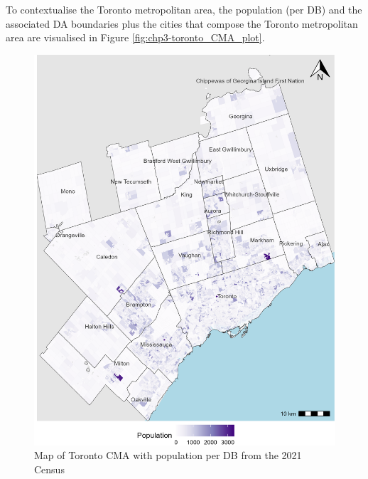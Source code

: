 \documentclass[
11pt, %
oneside, %
english, %
singlespacing, %
]{macthesis} %
\begin{document}
To contextualise the Toronto metropolitan area, the population (per DB) and the associated DA boundaries plus the cities that compose the Toronto metropolitan area are visualised in Figure \ref{fig:chp3-toronto_CMA_plot}.

\begin{figure}

{\centering \includegraphics[width=6in]{./data/figures/chp3-toronto_CMA_plot} 

}

\caption{\label{fig:chp3-toronto_CMA_plot}Map of Toronto CMA with population per DB from the 2021 Census}\label{fig:unnamed-chunk-42}
\end{figure}
\end{document}
